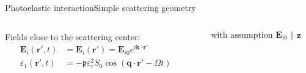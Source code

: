 \documentclass[11pt]{beamer}
\begin{document}
\begin{frame}{Photoelastic interaction}{Simple scattering geometry}
{
		}
		\pause
		\begin{columns}
			\begin{column}{0.6\textwidth}
				Fields close to the scattering center:
				\begin{align*}
					\bm{E}_i (\bm{r}',t) &= \bm{E}_i (\bm{r}') = \bm{E}_{i0} e^{i\bm{k}\cdot\bm{r}'} \\
					\varepsilon_1 (\bm{r}',t) &= -\mathfrak{p} \varepsilon_r^2 S_0 \cos(\bm{q} \cdot \bm{r}' - \Omega t)
				\end{align*}
			\end{column}
			\begin{column}{0.4\textwidth}
				\begin{equation*}
					\text{with assumption } \bm{E}_{i0} \parallel \bm{z}
				\end{equation*}
			\end{column}
		\end{columns}
	\end{frame}
	
\end{document}
